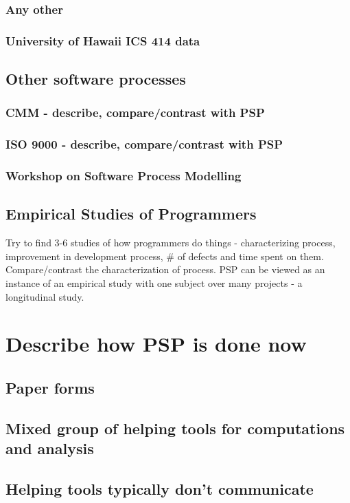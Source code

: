 \subsection{Any other}
\subsection{University of Hawaii ICS 414 data}
\section{Other software processes}
\subsection{CMM - describe, compare/contrast with PSP}
\subsection{ISO 9000 - describe, compare/contrast with PSP}
\subsection{Workshop on Software Process Modelling}
\section{Empirical Studies of Programmers}

Try to find 3-6 studies of how programmers do things -
characterizing process, improvement in development process, \# of defects
and time spent on them.  Compare/contrast the characterization of process.
PSP can be viewed as an instance of an empirical study with one subject
over many projects - a longitudinal study.

\chapter{Describe how PSP is done now}
\section{Paper forms}
\section{Mixed group of helping tools for computations and analysis}
\section{Helping tools typically don't communicate}

